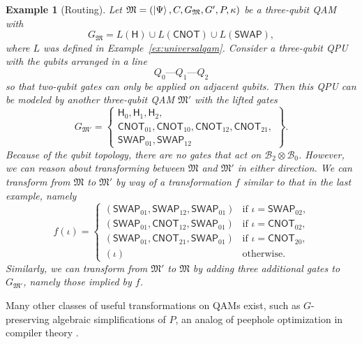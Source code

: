 \documentclass[conference]{IEEEtran}
\newcommand{\SWAP}{\ensuremath{\mathsf{SWAP}}}
\newcommand{\HADAMARD}{\ensuremath{\mathsf{H}}}
\newcommand{\CNOT}{\ensuremath{\mathsf{CNOT}}}
\newcommand{\BHil}{\ensuremath{\mathscr{B}}}
\newtheorem{example}{Example}
\begin{document}
\begin{example}[Routing]
Let $\mathfrak{M}=(\ket{\Psi}, C, G_{\mathfrak{M}}, G', P, \kappa)$ be a three-qubit QAM with
\[G_{\mathfrak{M}}=L(\HADAMARD)\cup L(\CNOT)\cup L(\SWAP),\]
where $L$ was defined in Example~\ref{ex:universalqam}. Consider a three-qubit QPU with the qubits arranged in a line \[\textrm{$Q_0$---$Q_1$---$Q_2$}\] so that two-qubit gates can only be applied on adjacent qubits. Then this QPU can be modeled by another three-qubit QAM $\mathfrak{M}'$ with the lifted gates
\[G_{\mathfrak{M}'}=
\left\{
\begin{array}{c}
\HADAMARD_0, \HADAMARD_1,  \HADAMARD_2,\\
\CNOT_{01}, \CNOT_{10}, \CNOT_{12}, \CNOT_{21},\\
\SWAP_{01}, \SWAP_{12}
\end{array}
\right\}.\]
Because of the qubit topology, there are no gates that act on $\BHil_2\otimes\BHil_0$. However, we can reason about transforming between $\mathfrak{M}$ and $\mathfrak{M}'$ in either direction. We can transform from $\mathfrak{M}$ to $\mathfrak{M}'$ by way of a transformation $f$ similar to that in the last example, namely
\begin{equation*}
    f(\iota) =
    \begin{cases}
    (\SWAP_{01}, \SWAP_{12}, \SWAP_{01}) &\text{if $\iota=\SWAP_{02}$,}\\
    (\SWAP_{01}, \CNOT_{12}, \SWAP_{01}) &\text{if $\iota=\CNOT_{02}$,}\\
    (\SWAP_{01}, \CNOT_{21}, \SWAP_{01}) &\text{if $\iota=\CNOT_{20}$,}\\
    (\iota)                              &\text{otherwise.}
    \end{cases}
\end{equation*}
Similarly, we can transform from $\mathfrak{M}'$ to $\mathfrak{M}$ by adding three additional gates to $G_{\mathfrak{M}'}$, namely those implied by $f$.
\end{example}

Many other classes of useful transformations on QAMs exist, such as $G$-preserving algebraic simplifications of $P$, an analog of peephole optimization in compiler theory \cite{McKeeman:1965:PO:364995.365000}.
\end{document}
